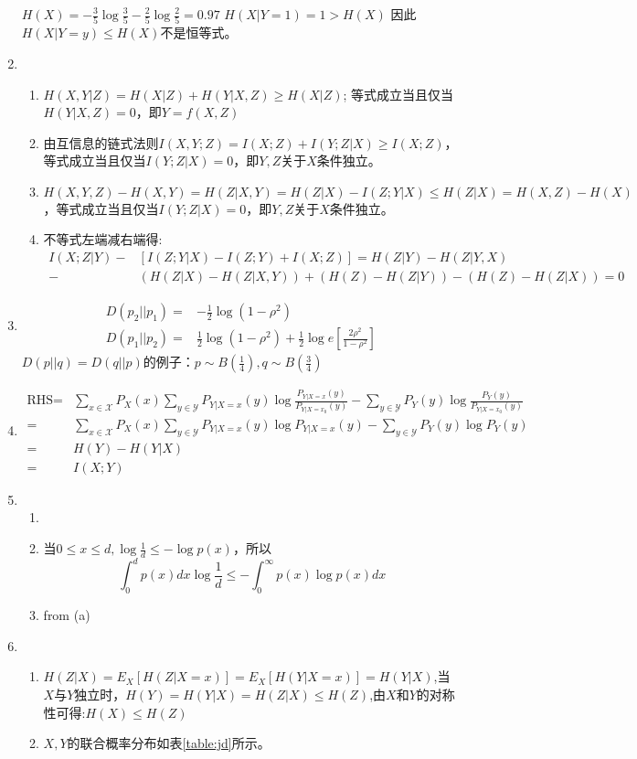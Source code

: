 \documentclass{article}
\begin{document}
\begin{enumerate}
$H(X)=-\frac{3}{5}\log\frac{3}{5}-\frac{2}{5}\log\frac{2}{5}=0.97$
$H(X|Y=1)=1>H(X)$
因此$H(X|Y=y)\leq H(X)$不是恒等式。
\item
\begin{enumerate}[label=(\alph*)]
\item $H(X,Y|Z)=H(X|Z)+H(Y|X,Z)\geq H(X|Z)$; 等式成立当且仅当$H(Y|X,Z)=0$，即$Y=f(X,Z)$
\item 由互信息的链式法则$I(X,Y;Z)=I(X;Z)+I(Y;Z|X)\geq I(X;Z)$，等式成立当且仅当$I(Y;Z|X)=0$，即$Y,Z$关于$X$条件独立。
\item $H(X,Y,Z)-H(X,Y)=H(Z|X,Y)=H(Z|X)-I(Z;Y|X)\leq H(Z|X) = H(X,Z)-H(X)$，等式成立当且仅当$I(Y;Z|X)=0$，即$Y,Z$关于$X$条件独立。
\item 不等式左端减右端得:
\begin{align*}
I(X;Z|Y)-&[I(Z;Y|X)-I(Z;Y)+I(X;Z)] =  H(Z|Y)-H(Z|Y,X)\\
-&(H(Z|X)-H(Z|X,Y))+(H(Z)-H(Z|Y))-(H(Z)-H(Z|X))=0
\end{align*}
\end{enumerate}
\item 
\begin{align*}
D(p_2 || p_1) = & -\frac{1}{2} \log(1-\rho^2) \\
D(p_1 || p_2) = &  \frac{1}{2} \log(1-\rho^2) + \frac{1}{2}\log e [\frac{2\rho^2}{1-\rho^2}]
\end{align*}
$D(p || q)=D(q || p)$的例子：$p\sim B(\frac{1}{4}),q \sim B(\frac{3}{4})$
\item 
\begin{align*}
\text{RHS}=&\sum_{x\in \mathcal{X}} P_X (x)\sum_{y \in \mathcal{Y}} P_{Y|X=x}(y)\log
\frac{P_{Y|X=x}(y)}{P_{Y|X={x_0}}(y)}-\sum_{y \in \mathcal{Y}} P_{Y}(y)\log
\frac{P_{Y}(y)}{P_{Y|X={x_0}}(y)}\\
=&\sum_{x\in \mathcal{X}} P_X (x)\sum_{y \in \mathcal{Y}} P_{Y|X=x}(y)\log
{P_{Y|X=x}(y)}-\sum_{y \in \mathcal{Y}} P_{Y}(y)\log
{P_{Y}(y)}\\
=&H(Y)-H(Y|X)\\
=&I(X;Y)
\end{align*}
\item
\begin{enumerate}[label=(\alph*)]
\item 
\item 
当$0\leq x\leq d, \log \frac{1}{d}\leq -\log p(x)$，所以
\begin{equation}
\int_{0}^d p(x)dx \log\frac{1}{d} \leq  -\int_0^{\infty} p(x)\log p(x)dx
\end{equation}
\item from (a)
\end{enumerate}
\item
\begin{enumerate}[label=(\alph*)]
\item $H(Z|X)=E_X[H(Z|X=x)]=E_X[H(Y|X=x)]=H(Y|X)$,当$X$与$Y$独立时，$H(Y)=H(Y|X)=H(Z|X)\leq H(Z)$,由$X$和$Y$的对称性可得:$H(X)\leq H(Z)$
\item $X,Y$的联合概率分布如表\ref{table:jd}所示。


\end{enumerate}
\end{enumerate}
\end{document}
